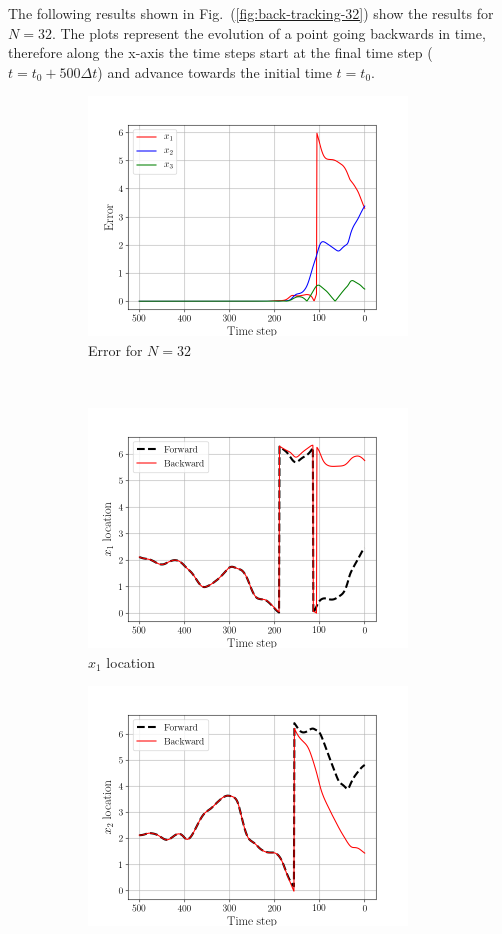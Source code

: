 The following results shown in Fig.~(\ref{fig:back-tracking-32}) show the
results for $N=32$. The plots represent the evolution of a point going
backwards in time, therefore along the x-axis the time steps start at the
final time step ($t=t_{0} + 500 \Delta t$) and advance towards the initial
time $t=t_{0}$.  
\begin{figure}[H]
    \begin{subfigure}[H]{0.45\textwidth}
        \includegraphics[height=2.5in]{media/rk4/run-32/error-32.png}
        \caption{Error for $N=32$}
    \end{subfigure}
    ~
    \begin{subfigure}[H]{0.45\textwidth}
        \includegraphics[height=2.5in]{media/rk4/run-32/x1-32-tracking.png}
        \caption{$x_{1}$ location}
    \end{subfigure}
    \newline
    \begin{subfigure}[H]{0.45\textwidth}
        \includegraphics[height=2.5in]{media/rk4/run-32/x2-32-tracking.png}

\end{subfigure}
\end{figure}
